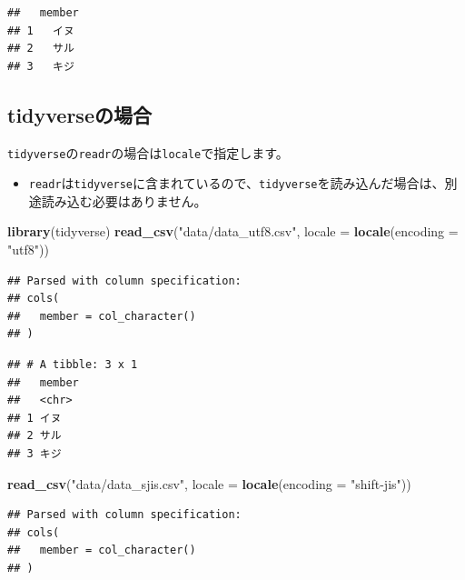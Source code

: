 \documentclass[]{bxjsreport}
\newenvironment{Shaded}{\begin{snugshade}}{\end{snugshade}}
\newcommand{\DataTypeTok}[1]{\textcolor[rgb]{0.13,0.29,0.53}{#1}}
\newcommand{\KeywordTok}[1]{\textcolor[rgb]{0.13,0.29,0.53}{\textbf{#1}}}
\newcommand{\NormalTok}[1]{#1}
\newcommand{\StringTok}[1]{\textcolor[rgb]{0.31,0.60,0.02}{#1}}
\providecommand{\tightlist}{%
  \setlength{\itemsep}{0pt}\setlength{\parskip}{0pt}}
\let\asdf\section
\renewcommand{\section}{\chapter}
\let\asdff\subsection
\renewcommand{\subsection}{\asdf}
\renewcommand{\subsubsection}{\asdff}
\begin{document}
\begin{verbatim}
##   member
## 1   イヌ
## 2   サル
## 3   キジ
\end{verbatim}

\hypertarget{tidyverseux306eux5834ux5408}{%
\subsubsection{tidyverseの場合}\label{tidyverseux306eux5834ux5408}}

\texttt{tidyverse}の\texttt{readr}の場合は\texttt{locale}で指定します。

\begin{itemize}
\tightlist
\item
  \texttt{readr}は\texttt{tidyverse}に含まれているので、\texttt{tidyverse}を読み込んだ場合は、別途読み込む必要はありません。
\end{itemize}

\begin{Shaded}
\begin{Highlighting}[]
\KeywordTok{library}\NormalTok{(tidyverse)}
\KeywordTok{read_csv}\NormalTok{(}\StringTok{"data/data_utf8.csv"}\NormalTok{, }\DataTypeTok{locale =} \KeywordTok{locale}\NormalTok{(}\DataTypeTok{encoding =} \StringTok{"utf8"}\NormalTok{))}
\end{Highlighting}
\end{Shaded}

\begin{verbatim}
## Parsed with column specification:
## cols(
##   member = col_character()
## )
\end{verbatim}

\begin{verbatim}
## # A tibble: 3 x 1
##   member
##   <chr> 
## 1 イヌ  
## 2 サル  
## 3 キジ
\end{verbatim}

\begin{Shaded}
\begin{Highlighting}[]
\KeywordTok{read_csv}\NormalTok{(}\StringTok{"data/data_sjis.csv"}\NormalTok{, }\DataTypeTok{locale =} \KeywordTok{locale}\NormalTok{(}\DataTypeTok{encoding =} \StringTok{"shift-jis"}\NormalTok{))}
\end{Highlighting}
\end{Shaded}

\begin{verbatim}
## Parsed with column specification:
## cols(
##   member = col_character()
## )
\end{verbatim}
\end{document}
